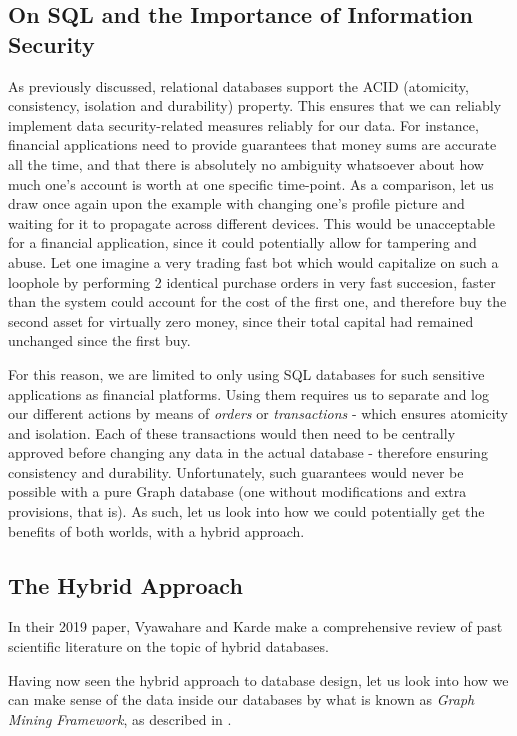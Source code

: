 \documentclass[10pt,        %
               a4paper,     %
               journal,     %
               ]{IEEEtran}
\begin{document}
\subsection{On SQL and the Importance of Information Security}
As previously discussed, relational databases support the ACID (atomicity, consistency, isolation and durability) property. This ensures that we can reliably implement data security-related measures reliably for our data. For instance, financial applications need to provide guarantees that money sums are accurate all the time, and that there is absolutely no ambiguity whatsoever about how much one's account is worth at one specific time-point. As a comparison, let us draw once again upon the example with changing one's profile picture and waiting for it to propagate across different devices. This would be unacceptable for a financial application, since it could potentially allow for tampering and abuse. Let one imagine a very trading fast bot which would capitalize on such a loophole by performing 2 identical purchase orders in very fast succesion, faster than the system could account for the cost of the first one, and therefore buy the second asset for virtually zero money, since their total capital had remained unchanged since the first buy. \par
For this reason, we are limited to only using SQL databases for such sensitive applications as financial platforms. Using them requires us to separate and log our different actions by means of \textit{orders} or \textit{transactions} - which ensures atomicity and isolation. Each of these transactions would then need to be centrally approved before changing any data in the actual database - therefore ensuring consistency and durability. Unfortunately, such guarantees would never be possible with a pure Graph database (one without modifications and extra provisions, that is). As such, let us look into how we could potentially get the benefits of both worlds, with a hybrid approach.\par

\subsection{The Hybrid Approach}
In their 2019 paper, Vyawahare and Karde \cite{IEEEpaper3:hybrid} make a comprehensive review of past scientific literature on the topic of hybrid databases. \par

Having now seen the hybrid approach to database design, let us look into how we can make sense of the data inside our databases by what is known as \textit{Graph Mining Framework}, as described in \cite{IEEEpaper2:mining}.
\end{document}
